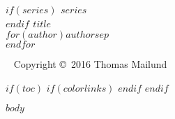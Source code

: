 \documentclass[11pt,twoside,openright]{memoir}
\begin{document}

\begingroup
\thispagestyle{empty}
{\bfseries\sffamily\noindent
$if(series)$ {\Large $series$}\\[50pt]$endif$ %
{\Huge $title$}\\[35pt] %
{\huge $for(author)$$author$$sep$\\$endfor$} %
}
\vfill
\endgroup



\newpage
~\vfill
\thispagestyle{empty}
\noindent Copyright \copyright\ 2016 Thomas Mailund\\ %
\clearpage


$if(toc)$
$if(colorlinks)$
\hypersetup{linkcolor=$if(toccolor)$$toccolor$$else$black$endif$}
$endif$
\setcounter{tocdepth}{1}
\pagestyle{empty} %
\tableofcontents %
\cleardoublepage %
$endif$



\pagestyle{Ruled}
$body$

\end{document}
